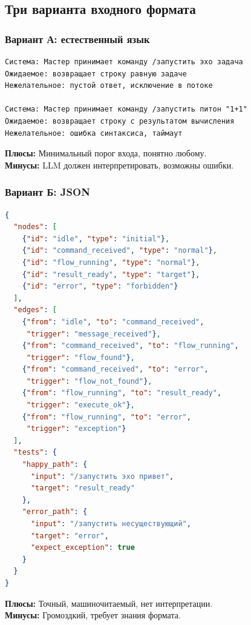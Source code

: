 \documentclass[10pt, oneside]{article}
\begin{document}
\subsection{Три варианта входного формата}

\subsubsection{Вариант А: естественный язык}

\begin{lstlisting}[language={},caption={Описание на естественном языке}]
Система: Мастер принимает команду /запустить эхо задача
Ожидаемое: возвращает строку равную задаче
Нежелательное: пустой ответ, исключение в потоке

Система: Мастер принимает команду /запустить питон "1+1"
Ожидаемое: возвращает строку с результатом вычисления
Нежелательное: ошибка синтаксиса, таймаут
\end{lstlisting}

\textbf{Плюсы:} Минимальный порог входа, понятно любому.\\
\textbf{Минусы:} LLM должен интерпретировать, возможны ошибки.

\subsubsection{Вариант Б: JSON}

\begin{lstlisting}[language=JSON,caption={Граф в формате JSON}]
{
  "nodes": [
    {"id": "idle", "type": "initial"},
    {"id": "command_received", "type": "normal"},
    {"id": "flow_running", "type": "normal"},
    {"id": "result_ready", "type": "target"},
    {"id": "error", "type": "forbidden"}
  ],
  "edges": [
    {"from": "idle", "to": "command_received",
     "trigger": "message_received"},
    {"from": "command_received", "to": "flow_running",
     "trigger": "flow_found"},
    {"from": "command_received", "to": "error",
     "trigger": "flow_not_found"},
    {"from": "flow_running", "to": "result_ready",
     "trigger": "execute_ok"},
    {"from": "flow_running", "to": "error",
     "trigger": "exception"}
  ],
  "tests": {
    "happy_path": {
      "input": "/запустить эхо привет",
      "target": "result_ready"
    },
    "error_path": {
      "input": "/запустить несуществующий",
      "target": "error",
      "expect_exception": true
    }
  }
}
\end{lstlisting}

\textbf{Плюсы:} Точный, машиночитаемый, нет интерпретации.\\
\textbf{Минусы:} Громоздкий, требует знания формата.
\end{document}
